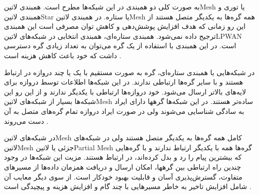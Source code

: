 
به صورت کلی دو همبندی در این شبکه‌ها مطرح است. همبندی ‌لاتین{Mesh} یا توری
و همبندی ‌لاتین{Star} یا ستاره.
در همبندی ‌لاتین{Mesh} همه گره‌ها به یکدیگر متصل هستند از این رو زمانی که هدف
افزایش پوشش‌دهی و کاهش توان مصرفی است این همبندی ترجیح داده نمی‌شود. همبندی
ستاره‌ای، همبندی انتخابی در شبکه‌های ‌لاتین{LPWAN} است.
در این همبندی با استفاده از یک گره می‌توان به تعداد زیادی گره دسترسی داشت که
خود باعث کاهش هزینه است
.

در شبکه‌هایی با همبندی ستاره‌ای، گره به صورت مستقیم با یک یا چند دروازه در ارتباط هستند
و با سایر گره‌ها ارتباطی ندارند. در این شبکه‌ها اطلاعات توسط دروازه برای لایه‌های بالاتر ارسال می‌شود.
خود دروازه‌ها ارتباطی با یکدیگر ندارند و از این رو این شبکه‌ها بسیار از شبکه‌های ‌لاتین{Mesh} ساده‌تر هستند.
در این شبکه‌ها گرهها دارای ایراد به سادگی شناسایی می‌شوند ولی در صورت ایراد دروازه تمام گره‌های
متصل به آن دست می‌روند
.

در شبکه‌های ‌لاتین{Mesh} کامل همه گره‌ها به یکدیگر متصل هستند ولی در شبکه‌های ‌لاتین{Mesh} جزئی یا ‌لاتین{Partial Mesh} گره‌ها
همه با یکدیگر ارتباط ندارند و با گره‌هایی که بیشترین پیام را رد و بدل کرده‌اند، در ارتباط هستند.
مزیت این شبکه‌ها در وجود چندین راه ارتباطی بین گرهها، امکان ارسال و دریافت همزمان داده‌ها از مسیرهای متفاوت،
گسترش‌پذیری آسان و قابلیت بهبود خودکار است. از سوی دیگر معایب آن شامل افزایش تاخیر به خاطر مسیرهایی با چند گام و
افزایش هزینه و پیچیدگی است
.
